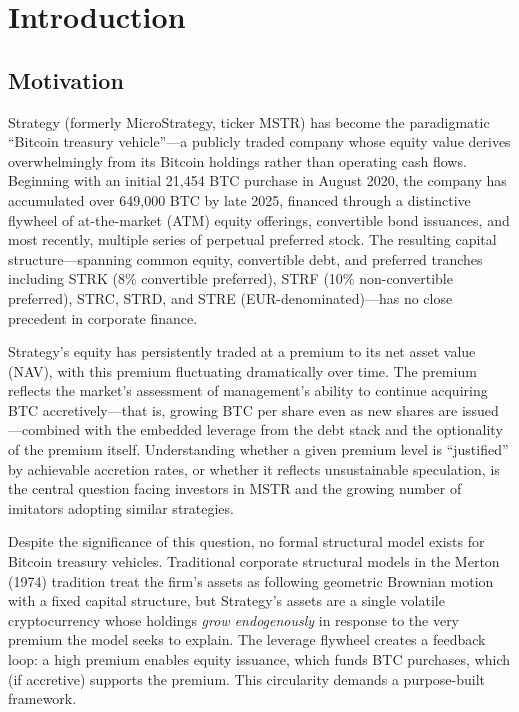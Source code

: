 \section{Introduction}

\subsection{Motivation}

Strategy (formerly MicroStrategy, ticker MSTR) has become the paradigmatic ``Bitcoin treasury vehicle''---a publicly traded company whose equity value derives overwhelmingly from its Bitcoin holdings rather than operating cash flows. Beginning with an initial 21{,}454 BTC purchase in August 2020, the company has accumulated over 649{,}000 BTC by late 2025, financed through a distinctive flywheel of at-the-market (ATM) equity offerings, convertible bond issuances, and most recently, multiple series of perpetual preferred stock. The resulting capital structure---spanning common equity, convertible debt, and preferred tranches including STRK (8\% convertible preferred), STRF (10\% non-convertible preferred), STRC, STRD, and STRE (EUR-denominated)---has no close precedent in corporate finance.

Strategy's equity has persistently traded at a premium to its net asset value (NAV), with this premium fluctuating dramatically over time. The premium reflects the market's assessment of management's ability to continue acquiring BTC accretively---that is, growing BTC per share even as new shares are issued---combined with the embedded leverage from the debt stack and the optionality of the premium itself. Understanding whether a given premium level is ``justified'' by achievable accretion rates, or whether it reflects unsustainable speculation, is the central question facing investors in MSTR and the growing number of imitators adopting similar strategies.

Despite the significance of this question, no formal structural model exists for Bitcoin treasury vehicles. Traditional corporate structural models in the Merton (1974) tradition treat the firm's assets as following geometric Brownian motion with a fixed capital structure, but Strategy's assets are a single volatile cryptocurrency whose holdings \emph{grow endogenously} in response to the very premium the model seeks to explain. The leverage flywheel creates a feedback loop: a high premium enables equity issuance, which funds BTC purchases, which (if accretive) supports the premium. This circularity demands a purpose-built framework.

